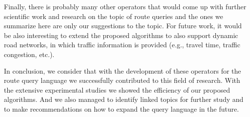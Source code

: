 Finally, there is probably many other operators that would come up with further scientific work and research on the topic of route queries and the ones we summarize here are only our suggestions to the topic. For future work, it would be also interesting to extend the proposed algorithms to also support dynamic road networks, in which traffic information is provided (e.g., travel time, traffic congestion, etc.).

\pagebreak

In conclusion, we consider that with the development of these operators for the route query language we successfully contributed to this field of research. With the extensive experimental studies we showed the efficiency of our proposed algorithms. And we also managed to identify linked topics for further study and to make recommendations on how to expand the query language in the future. 


